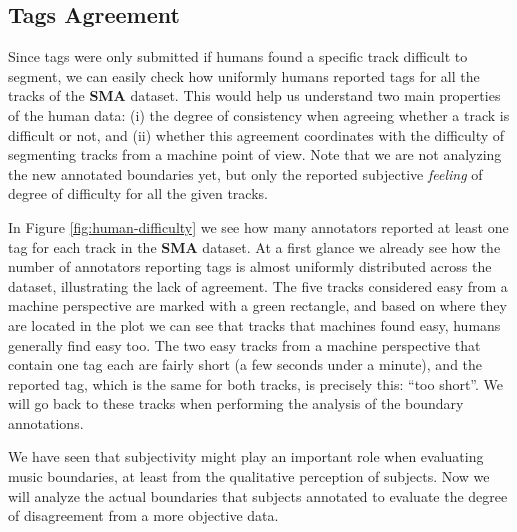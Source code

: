 \documentclass{article}
\begin{document}
\subsection{Tags Agreement}

Since tags were only submitted if humans found a specific track difficult to segment, we can easily check how uniformly humans reported tags for all the tracks of the \textbf{SMA} dataset.
This would help us understand two main properties of the human data: (i) the degree of consistency when agreeing whether a track is difficult or not, and (ii) whether this agreement coordinates with the difficulty of segmenting tracks from a machine point of view.
Note that we are not analyzing the new annotated boundaries yet, but only the reported subjective \textit{feeling} of degree of difficulty for all the given tracks.

In Figure \ref{fig:human-difficulty} we see how many annotators reported at least one tag for each track in the \textbf{SMA} dataset.
At a first glance we already see how the number of annotators reporting tags is almost uniformly distributed across the dataset, illustrating the lack of agreement. 
The five tracks considered easy from a machine perspective are marked with a green rectangle, and based on where they are located in the plot we can see that tracks that machines found easy, humans generally find easy too.
The two easy tracks from a machine perspective that contain one tag each are fairly short (a few seconds under a minute), and the reported tag, which is the same for both tracks, is precisely this: ``too short''.
We will go back to these tracks when performing the analysis of the boundary annotations.




We have seen that subjectivity might play an important role when evaluating music boundaries, at least from the qualitative perception of subjects.
Now we will analyze the actual boundaries that subjects annotated to evaluate the degree of disagreement from a more objective data.
\end{document}
